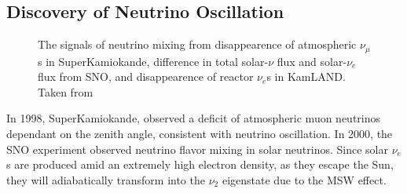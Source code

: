 \documentclass[/main.tex]{subfiles}
\begin{document}
\subsection{Discovery of Neutrino Oscillation}
\begin{figure}[t]
  \centering
  \caption[Confirmation of Neutrino Oscillation]{\label{fig:nuoscillation}
    The signals of neutrino mixing from disappearence of atmospheric $\nu_\mu$s in SuperKamiokande, difference in total solar-$\nu$ flux and solar-$\nu_e$ flux from SNO, and disappearence of reactor $\nu_e$s in KamLAND. Taken from \cite{PDG2018}}
\end{figure}
  In 1998, SuperKamiokande, observed a deficit of atmospheric muon neutrinos dependant on the zenith angle, consistent with neutrino oscillation\cite{superk1998}.
In 2000, the SNO experiment observed neutrino flavor mixing in solar neutrinos.
Since solar $\nu_e$s are produced amid an extremely high electron density, as they escape the Sun, they will adiabatically transform into the $\nu_2$ eigenstate due to the MSW effect.
\end{document}
